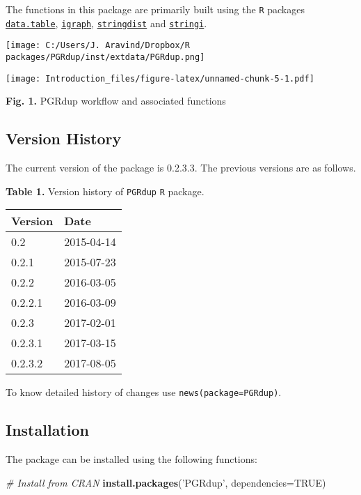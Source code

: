 \documentclass[]{article}
\newenvironment{Shaded}{\begin{snugshade}}{\end{snugshade}}
\newcommand{\CommentTok}[1]{\textcolor[rgb]{0.56,0.35,0.01}{\textit{#1}}}
\newcommand{\DataTypeTok}[1]{\textcolor[rgb]{0.13,0.29,0.53}{#1}}
\newcommand{\KeywordTok}[1]{\textcolor[rgb]{0.13,0.29,0.53}{\textbf{#1}}}
\newcommand{\NormalTok}[1]{#1}
\newcommand{\OtherTok}[1]{\textcolor[rgb]{0.56,0.35,0.01}{#1}}
\newcommand{\StringTok}[1]{\textcolor[rgb]{0.31,0.60,0.02}{#1}}
\begin{document}
The functions in this package are primarily built using the \texttt{R}
packages
\href{https://CRAN.R-project.org/package=data.table}{\texttt{data.table}},
\href{https://CRAN.R-project.org/package=igraph}{\texttt{igraph}},
\href{https://CRAN.R-project.org/package=stringdist}{\texttt{stringdist}}
and \href{https://CRAN.R-project.org/package=stringi}{\texttt{stringi}}.

\clearpage
\pagebreak

\begin{center}
    \texttt{[image: C:/Users/J. Aravind/Dropbox/R packages/PGRdup/inst/extdata/PGRdup.png]}
\end{center}

\texttt{[image: Introduction\_files/figure-latex/unnamed-chunk-5-1.pdf]}

\textbf{Fig. 1.} PGRdup workflow and associated functions

\hypertarget{version-history}{%
\subsection{Version History}\label{version-history}}

The current version of the package is 0.2.3.3. The previous versions are
as follows.

\textbf{Table 1.} Version history of \texttt{PGRdup} \texttt{R} package.

\begin{longtable}[]{@{}ll@{}}
\toprule
Version & Date\tabularnewline
\midrule
\endhead
0.2 & 2015-04-14\tabularnewline
0.2.1 & 2015-07-23\tabularnewline
0.2.2 & 2016-03-05\tabularnewline
0.2.2.1 & 2016-03-09\tabularnewline
0.2.3 & 2017-02-01\tabularnewline
0.2.3.1 & 2017-03-15\tabularnewline
0.2.3.2 & 2017-08-05\tabularnewline
\bottomrule
\end{longtable}

To know detailed history of changes use
\texttt{news(package=\textquotesingle{}PGRdup\textquotesingle{})}.

\pagebreak

\hypertarget{installation}{%
\subsection{Installation}\label{installation}}

The package can be installed using the following functions:

\begin{Shaded}
\begin{Highlighting}[]
\CommentTok{# Install from CRAN}
\KeywordTok{install.packages}\NormalTok{(}\StringTok{'PGRdup'}\NormalTok{, }\DataTypeTok{dependencies=}\OtherTok{TRUE}\NormalTok{)}
\end{Highlighting}
\end{Shaded}
\end{document}
